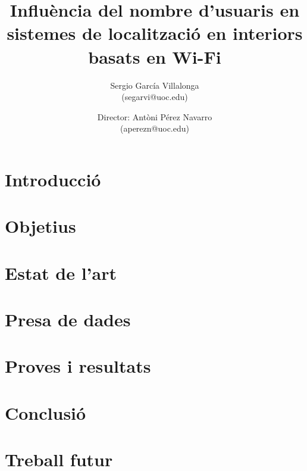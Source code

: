 \documentclass[a4paper, 10pt, twocolumn]{article}
\title{Influència del nombre d'usuaris en sistemes de localització en interiors basats en Wi-Fi}
\author{Sergio García Villalonga \\
          (segarvi@uoc.edu)
          \and Director: Antòni Pérez Navarro \\
          (aperezn@uoc.edu)}
\begin{document}
\maketitle



\section{Introducció}

 
\section{Objetius}


\section{Estat de l'art}


\section{Presa de dades}


\section{Proves i resultats}


\section{Conclusió}


\section{Treball futur}





%
%
\end{document}
